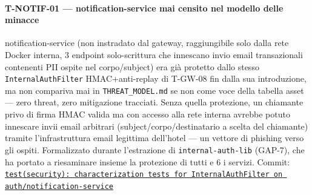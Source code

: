 ﻿\documentclass[a4paper,12pt]{report}
\newcommand{\commitref}[2]{\texttt{\small \href{https://github.com/diegoandruccioli/hotel-pms/commit/#1}{#2}}}
\begin{document}
\paragraph{T-NOTIF-01 --- notification-service mai censito nel modello delle minacce}
notification-service (non instradato dal gateway, raggiungibile solo dalla rete
Docker interna, 3 endpoint solo-scrittura che innescano invio email transazionali
contenenti PII ospite nel corpo/subject) era già protetto dallo stesso
\texttt{InternalAuthFilter} HMAC+anti-replay di T-GW-08 fin dalla sua introduzione,
ma non compariva mai in \texttt{THREAT\_MODEL.md} se non come voce della tabella
asset --- zero threat, zero mitigazione tracciati. Senza quella protezione, un
chiamante privo di firma HMAC valida ma con accesso alla rete interna avrebbe
potuto innescare invii email arbitrari (subject/corpo/destinatario a scelta del
chiamante) tramite l'infrastruttura email legittima dell'hotel --- un vettore di
phishing verso gli ospiti. Formalizzato durante l'estrazione di
\texttt{internal-auth-lib} (GAP-7), che ha portato a riesaminare insieme la
protezione di tutti e 6 i servizi.
Commit: \commitref{5d13a7d}{test(security): characterization tests for InternalAuthFilter on auth/notification-service}
\end{document}
